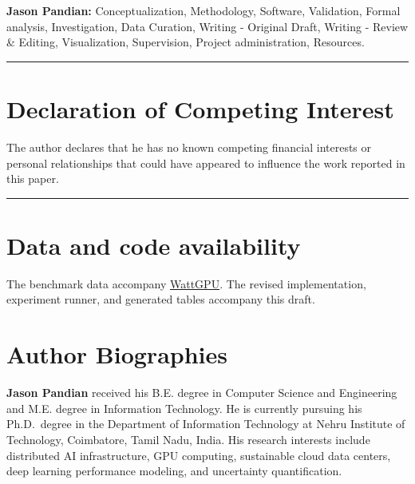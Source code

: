 \documentclass[preprint,12pt]{elsarticle}
\begin{document}
\textbf{Jason Pandian:} Conceptualization, Methodology, Software,
Validation, Formal analysis, Investigation, Data Curation, Writing -
Original Draft, Writing - Review \& Editing, Visualization, Supervision,
Project administration, Resources.

\begin{center}\rule{0.5\linewidth}{0.5pt}\end{center}

\section*{Declaration of Competing
Interest}\label{declaration-of-competing-interest}

The author declares that he has no known competing financial interests
or personal relationships that could have appeared to influence the work
reported in this paper.

\begin{center}\rule{0.5\linewidth}{0.5pt}\end{center}

\section*{Data and code availability}\label{data-and-code-availability}

The benchmark data accompany
\href{https://github.com/maufadel/wattgpu}{WattGPU}. The revised
implementation, experiment runner, and generated tables accompany this
draft.

\section*{Author Biographies}\label{author-biographies}

\textbf{Jason Pandian} received his B.E. degree in Computer Science and
Engineering and M.E. degree in Information Technology. He is currently
pursuing his Ph.D.~degree in the Department of Information Technology at
Nehru Institute of Technology, Coimbatore, Tamil Nadu, India. His
research interests include distributed AI infrastructure, GPU computing,
sustainable cloud data centers, deep learning performance modeling, and
uncertainty quantification.
\end{document}
